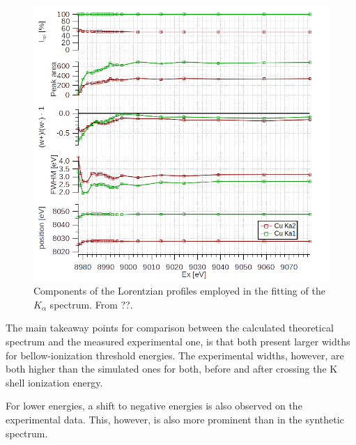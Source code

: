 \begin{figure}
    \includegraphics[width=\linewidth]{Chapters/Figures/Chapter5/ito.png}
    \caption{Components of the Lorentzian profiles employed in the fitting of the $K_{\alpha}$ spectrum. From ??.}\label{fig:ito}
\end{figure}


The main takeaway points for comparison between the calculated theoretical spectrum and the measured experimental one, is that both present larger widths for bellow-ionization threshold energies. The experimental widths, however, are both higher than the simulated ones for both, before and after crossing the K shell ionization energy.

For lower energies, a shift to negative energies is also observed on the experimental data. This, however, is also more prominent than in the synthetic spectrum.










